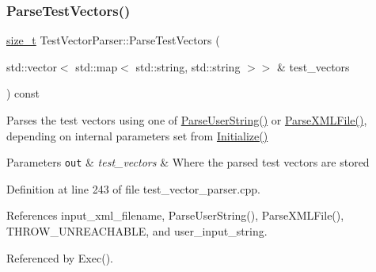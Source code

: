 \subsubsection{\texorpdfstring{Parse\+Test\+Vectors()}{ParseTestVectors()}}
{\footnotesize\ttfamily \hyperlink{tutorial__fpt__2017_2intro_2sixth_2test_8c_a7c94ea6f8948649f8d181ae55911eeaf}{size\+\_\+t} Test\+Vector\+Parser\+::\+Parse\+Test\+Vectors (\begin{DoxyParamCaption}\item[{std\+::vector$<$ std\+::map$<$ std\+::string, std\+::string $>$$>$ \&}]{test\+\_\+vectors }\end{DoxyParamCaption}) const\hspace{0.3cm}{\ttfamily [private]}}



Parses the test vectors using one of \hyperlink{classTestVectorParser_a92e072b1028880a427b199a32b020f23}{Parse\+User\+String()} or \hyperlink{classTestVectorParser_a0509f3e5b9c496651e6d896ce8d099c0}{Parse\+X\+M\+L\+File()}, depending on internal parameters set from \hyperlink{classTestVectorParser_aa48917a5ac5ec20341754ec35edd6b3a}{Initialize()} 


\begin{DoxyParams}[1]{Parameters}
\mbox{\tt out}  & {\em test\+\_\+vectors} & Where the parsed test vectors are stored \\
\hline
\end{DoxyParams}


Definition at line 243 of file test\+\_\+vector\+\_\+parser.\+cpp.



References input\+\_\+xml\+\_\+filename, Parse\+User\+String(), Parse\+X\+M\+L\+File(), T\+H\+R\+O\+W\+\_\+\+U\+N\+R\+E\+A\+C\+H\+A\+B\+LE, and user\+\_\+input\+\_\+string.



Referenced by Exec().

